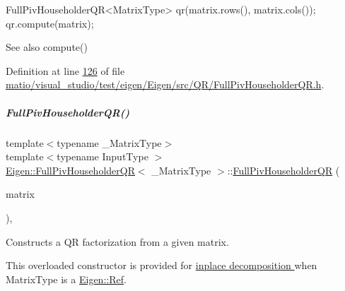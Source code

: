 \begin{DoxyCode}
FullPivHouseholderQR<MatrixType> qr(matrix.rows(), matrix.cols());
qr.compute(matrix);
\end{DoxyCode}


\begin{DoxySeeAlso}{See also}
compute() 
\end{DoxySeeAlso}


Definition at line \hyperlink{matio_2visual__studio_2test_2eigen_2_eigen_2src_2_q_r_2_full_piv_householder_q_r_8h_source_l00126}{126} of file \hyperlink{matio_2visual__studio_2test_2eigen_2_eigen_2src_2_q_r_2_full_piv_householder_q_r_8h_source}{matio/visual\+\_\+studio/test/eigen/\+Eigen/src/\+Q\+R/\+Full\+Piv\+Householder\+Q\+R.\+h}.

\mbox{\label{group___q_r___module_ac9bdb4f7fa77c1aa16f238592c248e70}} 
\subparagraph{\texorpdfstring{Full\+Piv\+Householder\+Q\+R()}{FullPivHouseholderQR()}\hspace{0.1cm}{\footnotesize\ttfamily [8/8]}}
{\footnotesize\ttfamily template$<$typename \+\_\+\+Matrix\+Type$>$ \\
template$<$typename Input\+Type $>$ \\
\hyperlink{group___q_r___module_class_eigen_1_1_full_piv_householder_q_r}{Eigen\+::\+Full\+Piv\+Householder\+QR}$<$ \+\_\+\+Matrix\+Type $>$\+::\hyperlink{group___q_r___module_class_eigen_1_1_full_piv_householder_q_r}{Full\+Piv\+Householder\+QR} (\begin{DoxyParamCaption}\item[{\hyperlink{group___core___module_struct_eigen_1_1_eigen_base}{Eigen\+Base}$<$ Input\+Type $>$ \&}]{matrix }\end{DoxyParamCaption})\hspace{0.3cm}{\ttfamily [inline]}, {\ttfamily [explicit]}}



Constructs a QR factorization from a given matrix. 

This overloaded constructor is provided for \hyperlink{group___inplace_decomposition}{inplace decomposition } when {\ttfamily Matrix\+Type} is a \hyperlink{group___core___module_class_eigen_1_1_ref}{Eigen\+::\+Ref}.


